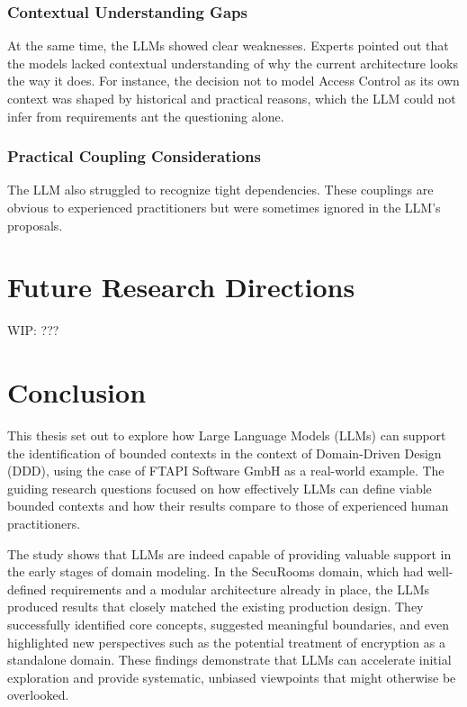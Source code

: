 \subsubsection{Contextual Understanding Gaps}
At the same time, the LLMs showed clear weaknesses. Experts pointed out that the models lacked contextual understanding of why the current architecture looks the way it does. For instance, the decision not to model Access Control as its own context was shaped by historical and practical reasons, which the LLM could not infer from requirements ant the questioning alone.

\subsubsection{Practical Coupling Considerations}
The LLM also struggled to recognize tight dependencies. These couplings are obvious to experienced practitioners but were sometimes ignored in the LLM's proposals.

\section{Future Research Directions}

WIP: ???

\section{Conclusion}

This thesis set out to explore how Large Language Models (LLMs) can support the identification of bounded contexts in the context of Domain-Driven Design (DDD), using the case of FTAPI Software GmbH as a real-world example. The guiding research questions focused on how effectively LLMs can define viable bounded contexts and how their results compare to those of experienced human practitioners.  

The study shows that LLMs are indeed capable of providing valuable support in the early stages of domain modeling. In the SecuRooms domain, which had well-defined requirements and a modular architecture already in place, the LLMs produced results that closely matched the existing production design. They successfully identified core concepts, suggested meaningful boundaries, and even highlighted new perspectives such as the potential treatment of encryption as a standalone domain. These findings demonstrate that LLMs can accelerate initial exploration and provide systematic, unbiased viewpoints that might otherwise be overlooked.  


